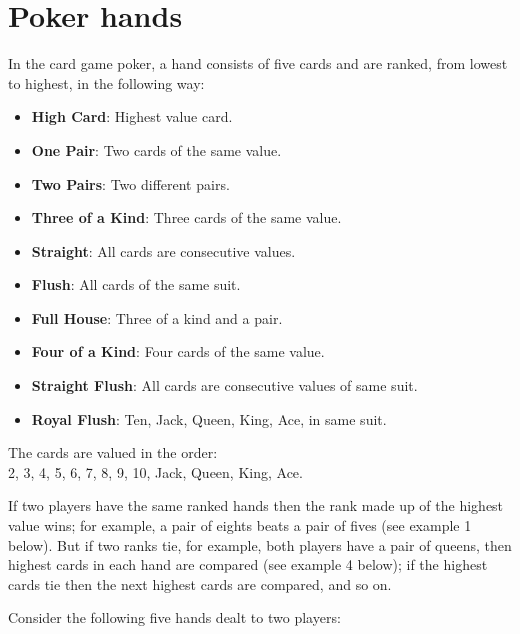 \section[Problem \#54: Poker hands]{Poker hands}
\label{sec:problem_54}

In the card game poker, a hand consists of five cards and are ranked,
from lowest to highest, in the following way:

\begin{itemize}
\tightlist
\item
  \textbf{High Card}: Highest value card.
\item
  \textbf{One Pair}: Two cards of the same value.
\item
  \textbf{Two Pairs}: Two different pairs.
\item
  \textbf{Three of a Kind}: Three cards of the same value.
\item
  \textbf{Straight}: All cards are consecutive values.
\item
  \textbf{Flush}: All cards of the same suit.
\item
  \textbf{Full House}: Three of a kind and a pair.
\item
  \textbf{Four of a Kind}: Four cards of the same value.
\item
  \textbf{Straight Flush}: All cards are consecutive values of same
  suit.
\item
  \textbf{Royal Flush}: Ten, Jack, Queen, King, Ace, in same suit.
\end{itemize}

The cards are valued in the order:\\
2, 3, 4, 5, 6, 7, 8, 9, 10, Jack, Queen, King, Ace.

If two players have the same ranked hands then the rank made up of the
highest value wins; for example, a pair of eights beats a pair of fives
(see example 1 below). But if two ranks tie, for example, both players
have a pair of queens, then highest cards in each hand are compared (see
example 4 below); if the highest cards tie then the next highest cards
are compared, and so on.

Consider the following five hands dealt to two players:


